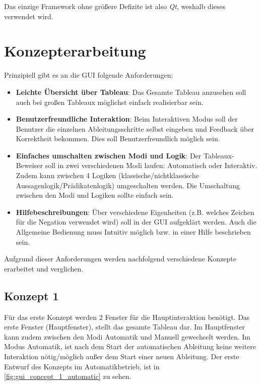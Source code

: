 Das einzige Framework ohne größere Defizite ist also \textit{Qt}, weshalb dieses verwendet wird.

\section{Konzepterarbeitung}
Prinzipiell gibt es an die \ac{GUI} folgende Anforderungen:
\begin{itemize}
\item \textbf{Leichte Übersicht über Tableau}: Das Gesamte Tableau anzusehen soll auch bei großen Tableaux möglichst einfach realisierbar sein.

\item \textbf{Benutzerfreundliche Interaktion}: Beim Interaktiven Modus soll der Benutzer die einzelnen Ableitungsschritte selbst eingeben und Feedback über Korrektheit bekommen. Dies soll Benutzerfreundlich möglich sein.

\item \textbf{Einfaches umschalten zwischen Modi und Logik}: Der Tableaux-Beweiser soll in zwei verschiedenen Modi laufen: Automatisch oder Interaktiv. Zudem kann zwischen 4 Logiken (klassische/nichtklassische Aussagenlogik/Prädikatenlogik) umgeschalten werden. Die Umschaltung zwischen den Modi und Logiken sollte einfach sein.

\item \textbf{Hilfebeschreibungen}: Über verschiedene Eigenheiten (z.B. welches Zeichen für die Negation verwendet wird) soll in der \ac{GUI} aufgeklärt werden. Auch die Allgemeine Bedienung muss Intuitiv möglich bzw. in einer Hilfe beschrieben sein.
\end{itemize}

Aufgrund dieser Anforderungen werden nachfolgend verschiedene Konzepte erarbeitet und verglichen.

\subsection{Konzept 1\label{sec:concept_1}}
Für das erste Konzept werden 2 Fenster für die Hauptinteraktion benötigt. Das erste Fenster (Hauptfenster), stellt das gesamte Tableau dar. Im Hauptfenster kann zudem zwischen den Modi Automatik und Manuell gewechselt werden. Im Modus Automatik, ist nach dem Start der automatischen Ableitung keine weitere Interaktion nötig/möglich außer dem Start einer neuen Ableitung. Der erste Entwurf des Konzepts im Automatikbetrieb, ist in \autoref{fig:gui_concept_1_automatic} zu sehen.

